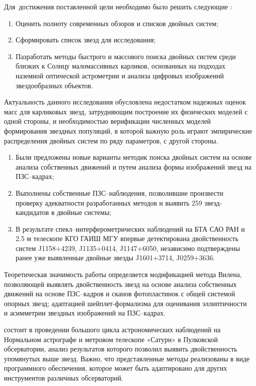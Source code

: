 Для~достижения поставленной цели необходимо было решить следующие {\tasks}:
\begin{enumerate}
  \item Оценить полноту современных обзоров и списков двойных систем;
  \item Сформировать список звезд для исследования;
  \item Пазработать методы быстрого и массового поиска двойных систем среди близких к Солнцу маломассивных карликов, основанных на подходах наземной оптической астрометрии и анализа цифровых изображений звездообразных объектов.
\end{enumerate}

Актуальность данного исследования обусловлена недостатком надежных оценок масс для карликовых звезд, затрудняющим построение их физических моделей с одной стороны, и необходимостью верификации численных моделей формирования звездных популяций, в которой важную роль играют эмпирические распределения двойных систем по ряду параметров, с другой стороны.

{\novelty}
\begin{enumerate}
  \item Были предложены новые варианты методик поиска двойных систем на основе анализа собственных движений и путем анализа формы изображений звезд на ПЗС--кадрах;
  \item Выполнены собственные ПЗС--наблюдения, позволившие произвести проверку адекватности разработанных методов и выявить 259 звезд-кандидатов в двойные системы;
  \item В результате спекл--интерферометрических наблюдений на БТА САО РАН и 2.5 м телескопе КГО ГАИШ МГУ впервые детектирована двойственность систем J1158+4239, J1135+0414, J1147+6050, независимо подтверждены ранее уже выявленные двойные звезды J1601+3714, J0259+3636.
\end{enumerate}

Теоретическая значимость работы определяется модификацией метода Вилена, позволяющей выявлять двойственность звезд на основе анализа собственных движений на основе ПЗС--кадров и сканов фотопластинок с общей системой опорных звезд; адаптацией шейплет-формализма для оценивания эллиптичности и асимметрии звездных изображений на ПЗС--кадрах.

{\influence} состоит в проведении большого цикла астрономических наблюдений на Нормальном астрографе и метровом телескопе «Сатурн» в Пулковской обсерватории, анализ результатов которого позволил выявить двойственность упомянутых выше звезд. Важно, что представленные методы реализованы в виде программного обеспечения, которое может быть адаптировано для других инструментов различных обсерваторий.

